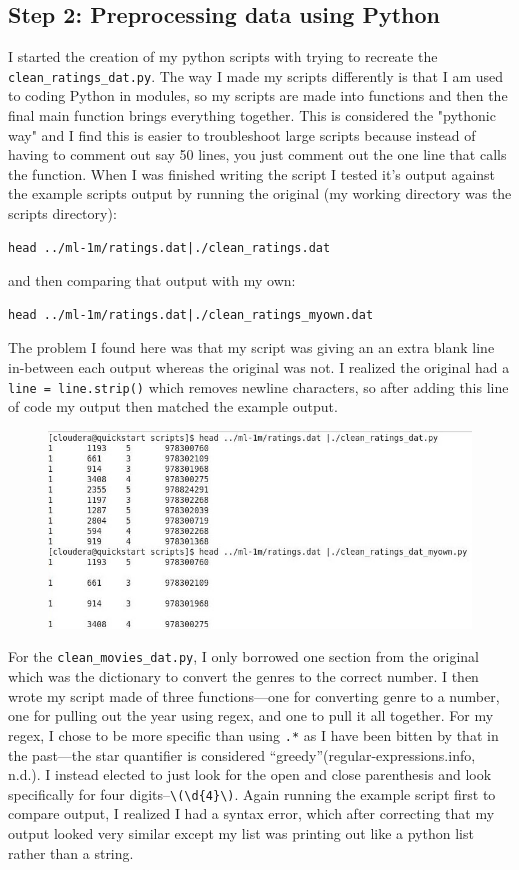 \documentclass[10pt]{article}
\begin{document}
\subsection*{Step 2: Preprocessing data using Python}
I started the creation of my python scripts with trying to recreate the \verb|clean_ratings_dat.py|. The way I made my scripts differently is that I am used to coding Python in modules, so my scripts are made into functions and then the final main function brings everything together. This is considered the "pythonic way" and I find this is easier to troubleshoot large scripts because instead of having to comment out say 50 lines, you just comment out the one line that calls the function. When I was finished writing the script I tested it’s output against the example scripts output by running the original (my working directory was the scripts directory): 
\begin{verbatim}head ../ml-1m/ratings.dat|./clean_ratings.dat\end{verbatim}
and then comparing that output with my own: 
\begin{verbatim}head ../ml-1m/ratings.dat|./clean_ratings_myown.dat\end{verbatim}
The problem I found here was that my script was giving an an extra blank line in-between each output whereas the original was not. I realized the original had a \verb|line = line.strip()| which removes newline characters, so after adding this line of code my output then matched the example output.
\begin{figure}[!h]
\includegraphics[scale=0.37]{missing_linestrip.jpg}
\centering
\end{figure}
\pagebreak
\par For the \verb|clean_movies_dat.py|, I only borrowed one section from the original which was the dictionary to convert the genres to the correct number. I then wrote my script made of three functions—one for converting genre to a number, one for pulling out the year using regex, and one to pull it all together. For my regex, I chose to be more specific than using \verb|.*| as I have been bitten by that in the past—the star quantifier is considered “greedy”(regular-expressions.info, n.d.). I instead elected to just look for the open and close parenthesis and look specifically for four digits--\verb|\(\d{4}\)|. Again running the example script first to compare output, I realized I had a syntax error, which after correcting that my output looked very similar except my list was printing out like a python list rather than a string. 
\end{document}
